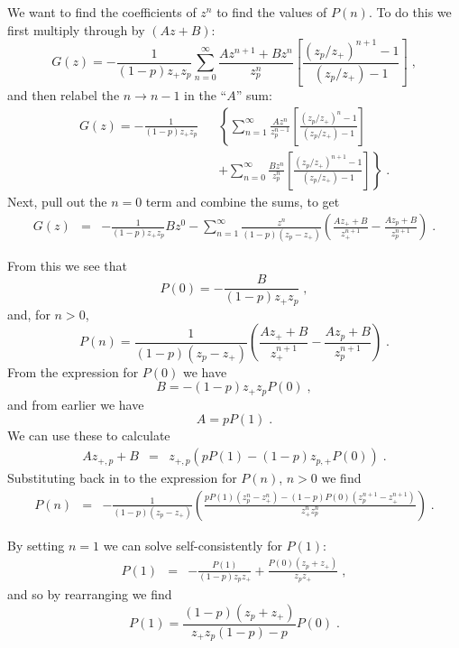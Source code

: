 \documentclass[a4paper,10pt]{article}
\begin{document}
We want to find the coefficients of $z^n$ to find the values of $P(n)$. To do this we first multiply through by $(Az + B)$:
\begin{equation}
 G(z) = - \frac{1}{(1-p)z_+z_p} \sum_{n=0}^\infty \frac{Az^{n+1} + Bz^n}{z_p^n} \left[ \frac{ (z_p/z_+)^{n+1} -1 }{(z_p/z_+) - 1} \right] \;,
\end{equation}
and then relabel the $n\to n-1$ in the ``$A$'' sum:
\begin{eqnarray}
 G(z) = - \frac{1}{(1-p)z_+z_p}  & & \left\{ \sum_{n=1}^\infty \frac{Az^n}{z_p^{n-1}} \left[ \frac{ (z_p/z_+)^n -1 }{(z_p/z_+) - 1} \right] \right. \nonumber \\ 
                                 & & +\left. \sum_{n=0}^\infty \frac{Bz^n}{z_p^n} \left[ \frac{ (z_p/z_+)^{n+1} -1 }{(z_p/z_+) - 1} \right] \right\} \;.
\end{eqnarray}
Next, pull out the $n=0$ term and combine the sums, to get
\begin{eqnarray}
 G(z) &=& -\frac{1}{(1-p)z_+z_p} Bz^0 
        - \sum_{n=1}^\infty\frac{ z^n}{(1-p)(z_p-z_+)} \left( \frac{Az_++B}{z_+^{n+1}} - \frac{Az_p+B}{z_p^{n+1}} \right) \;.
\end{eqnarray}

From this we see that
\begin{equation}
 P(0) = - \frac{B}{(1-p)z_+z_p} \;,
\end{equation}
and, for $n>0$, 
\begin{equation}
 P(n) = \frac{ 1}{(1-p)(z_p-z_+)} \left( \frac{Az_++B}{z_+^{n+1}} - \frac{Az_p+B}{z_p^{n+1}} \right) \;. 
\end{equation}
From the expression for $P(0)$ we have
\begin{equation}
  B = -(1-p)z_+z_pP(0) \;,
\end{equation}
and from earlier we have
\begin{equation}
  A = pP(1) \;.
\end{equation}
We can use these to calculate
\begin{eqnarray}
 Az_{+,p}+B &=& z_{+,p} (pP(1) - (1-p)z_{p,+}P(0) ) \;.
\end{eqnarray}
Substituting back in to the expression for $P(n)$, $n>0$ we find
\begin{eqnarray}
 P(n) &=& -\frac{1}{(1-p)(z_p-z_+)} \left( \frac{pP(1)(z_p^n-z_+^n) -(1-p)P(0)(z_p^{n+1} -z_+^{n+1})}{z_+^n z_p^n} \right) \;.
\end{eqnarray}

By setting $n=1$ we can solve self-consistently for $P(1)$:
\begin{eqnarray}
 P(1) &=& -\frac{P(1)}{(1-p)z_p z_+} + \frac{P(0)(z_p +z_+)}{z_pz_+} \;,
\end{eqnarray}
and so by rearranging we find
\begin{equation}
 P(1) = \frac{(1-p)(z_p + z_+)}{z_+ z_p (1-p) - p} P(0) \;.
\end{equation}
\end{document}
